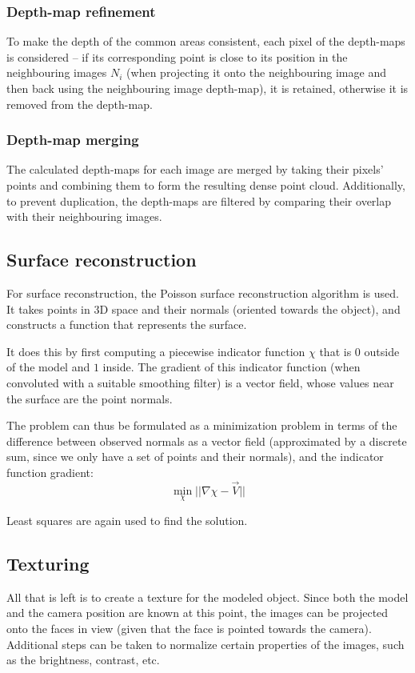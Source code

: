 \subsubsection{Depth-map refinement}
To make the depth of the common areas consistent, each pixel of the depth-maps is considered -- if its corresponding point is close to its position in the neighbouring images $N_i$ (when projecting it onto the neighbouring image and then back using the neighbouring image depth-map), it is retained, otherwise it is removed from the depth-map.

\subsubsection{Depth-map merging}
The calculated depth-maps for each image are merged by taking their pixels' points and combining them to form the resulting dense point cloud.
Additionally, to prevent duplication, the depth-maps are filtered by comparing their overlap with their neighbouring images.

\subsection{Surface reconstruction}
For surface reconstruction, the Poisson surface reconstruction algorithm \cite{kazhdan2006poisson} is used.
It takes points in 3D space and their normals (oriented towards the object), and constructs a function that represents the surface.

It does this by first computing a piecewise indicator function $\chi$ that is $0$ outside of the model and $1$ inside. The gradient of this indicator function (when convoluted with a suitable smoothing filter) is a vector field, whose values near the surface are the point normals.

The problem can thus be formulated as a minimization problem in terms of the difference between observed normals as a vector field (approximated by a discrete sum, since we only have a set of points and their normals), and the indicator function gradient:
\begin{equation} \min_\chi || \nabla \chi - \vec{V}|| \end{equation}

Least squares are again used to find the solution.

\subsection{Texturing}
All that is left is to create a texture for the modeled object.
Since both the model and the camera position are known at this point, the images can be projected onto the faces in view (given that the face is pointed towards the camera).
Additional steps can be taken to normalize certain properties of the images, such as the brightness, contrast, etc.

